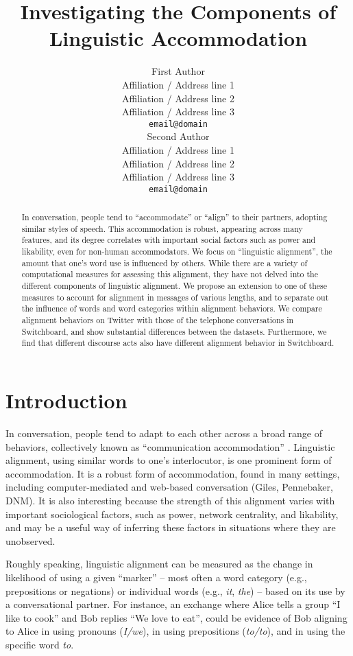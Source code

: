 \documentclass[11pt]{article}
\title{Investigating the Components of Linguistic Accommodation}
\author{First Author \\
  Affiliation / Address line 1 \\
  Affiliation / Address line 2 \\
  Affiliation / Address line 3 \\
  {\tt email@domain} \\\And
  Second Author \\
  Affiliation / Address line 1 \\
  Affiliation / Address line 2 \\
  Affiliation / Address line 3 \\
  {\tt email@domain} \\}
\date{}
\begin{document}
\maketitle
\begin{abstract}
In conversation, people tend to ``accommodate'' or ``align'' to their partners, adopting similar styles of speech.  This accommodation is robust, appearing across many features, and its degree correlates with important social factors such as power and likability, even for non-human accommodators. We focus on ``linguistic alignment'', the amount that one's word use is influenced by others. While there are a variety of computational measures for assessing this alignment, they have not delved into the different components of linguistic alignment. We propose an extension to one of these measures to account for alignment in messages of various lengths, and to separate out the influence of words and word categories within alignment behaviors. We compare alignment behaviors on Twitter with those of the telephone conversations in Switchboard, and show substantial differences between the datasets. Furthermore, we find that different discourse acts also have different alignment behavior in Switchboard.
\end{abstract}


\section{Introduction}
In conversation, people tend to adapt to each other across a broad range of behaviors, collectively known as ``communication accommodation'' \cite{GilesCouplandCoupland1991}. Linguistic alignment, using similar words to one's interlocutor, is one prominent form of accommodation.  It is a robust form of accommodation, found in many settings, including computer-mediated and web-based conversation (Giles, Pennebaker, DNM). It is also interesting because the strength of this alignment varies with important sociological factors, such as power, network centrality, and likability, and may be a useful way of inferring these factors in situations where they are unobserved.

Roughly speaking, linguistic alignment can be measured as the change in likelihood of using a given ``marker'' -- most often a word category (e.g., prepositions or negations) or individual words (e.g., \textit{it}, \textit{the}) -- based on its use by a conversational partner. For instance, an exchange where Alice tells a group ``I like to cook'' and Bob replies ``We love to eat'', could be evidence of Bob aligning to Alice in using pronouns (\textit{I/we}), in using prepositions (\textit{to/to}), and in using the specific word \textit{to}.
\end{document}
